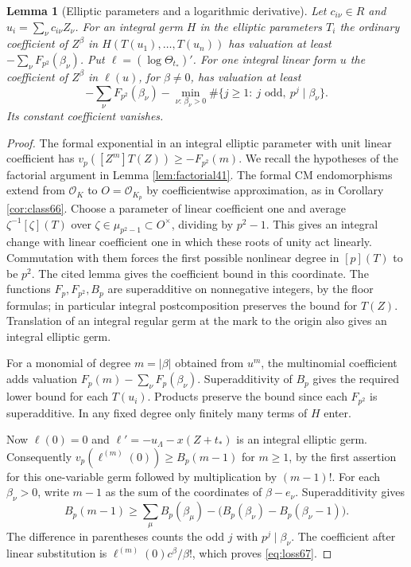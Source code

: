 \documentclass[a4paper,11pt]{article}
\newtheorem{lemma}[proposition]{Lemma}
\theoremstyle{definition}
\theoremstyle{remark}
\numberwithin{equation}{section}
\begin{document}
\begin{lemma}[Elliptic parameters and a logarithmic derivative]\label{lem:multijet67}
Let \(c_{i\nu}\in R\) and \(u_i=\sum_\nu c_{i\nu}Z_\nu\).
For an integral germ \(H\) in the elliptic parameters \(T_i\)
the ordinary coefficient of \(Z^\beta\) in
\(H(T(u_1),\ldots,T(u_n))\) has valuation at least
\(-\sum_\nu F_{p^2}(\beta_\nu)\). Put
\(\ell=(\log\Theta_{t_*})'\). For one integral linear form \(u\)
the coefficient of \(Z^\beta\) in \(\ell(u)\), for \(\beta\ne0\),
has valuation at least
\begin{equation}
 -\sum_\nu F_{p^2}(\beta_\nu)-
    \min_{\nu:\,\beta_\nu>0}\#\{j\ge1:\ j\text{ odd},\ p^j\mid\beta_\nu\}.
                                                       \label{eq:loss67}
\end{equation}
Its constant coefficient vanishes.
\end{lemma}
\begin{proof}
The formal exponential in an integral elliptic parameter with
unit linear coefficient has \(v_p([Z^m]T(Z))\ge-F_{p^2}(m)\).
We recall the hypotheses of the factorial argument in
Lemma \ref{lem:factorial41}.
The formal CM endomorphisms extend from \(\mathcal O_K\) to
\(O=\mathcal O_{K_p}\) by coefficientwise approximation, as in
Corollary \ref{cor:class66}. Choose a parameter of linear coefficient
one and average \(\zeta^{-1}[\zeta](T)\) over
\(\zeta\in\mu_{p^2-1}\subset O^\times\), dividing by \(p^2-1\).
This gives an integral change with linear coefficient one in which
these roots of unity act linearly. Commutation with them forces
the first possible nonlinear degree in \([p](T)\) to be \(p^2\).
The cited lemma gives the coefficient bound in this coordinate.
The functions \(F_p,F_{p^2},B_p\) are superadditive on nonnegative integers, by the floor formulas;
in particular integral postcomposition preserves the bound for
\(T(Z)\). Translation of an integral regular germ at the mark
to the origin also gives an integral elliptic germ.

For a monomial of degree \(m=|\beta|\) obtained from \(u^m\), the
multinomial coefficient adds valuation
\(F_p(m)-\sum_\nu F_p(\beta_\nu)\). Superadditivity of \(B_p\)
gives the required lower bound for each \(T(u_i)\).
Products preserve the bound since each \(F_{p^2}\) is
superadditive. In any fixed degree only finitely many terms
of \(H\) enter.

Now \(\ell(0)=0\) and \(\ell'=-u_\Lambda-x(Z+t_*)\) is an
integral elliptic germ. Consequently \(v_p(\ell^{(m)}(0))\ge
B_p(m-1)\) for \(m\ge1\), by the first assertion for this
one-variable germ followed by multiplication by \((m-1)!\).
For each \(\beta_\nu>0\), write \(m-1\) as the sum of the
coordinates of \(\beta-e_\nu\). Superadditivity gives
\[
 B_p(m-1)\ge\sum_\mu B_p(\beta_\mu)-
     \big(B_p(\beta_\nu)-B_p(\beta_\nu-1)\big).
\]
The difference in parentheses counts the odd \(j\) with
\(p^j\mid\beta_\nu\). The coefficient after linear substitution is
\(\ell^{(m)}(0)c^\beta/\beta!\), which proves \eqref{eq:loss67}.
\end{proof}
\end{document}
